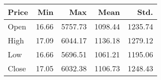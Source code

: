 \begin{tabular}{lrrrr}
\toprule
Price & Min & Max & Mean & Std. \\
\midrule
Open & 16.66 & 5757.73 & 1098.44 & 1235.74 \\
High & 17.09 & 6044.17 & 1136.18 & 1279.12 \\
Low & 16.66 & 5696.51 & 1061.21 & 1195.06 \\
Close & 17.05 & 6032.38 & 1106.73 & 1248.43 \\
\bottomrule
\end{tabular}
